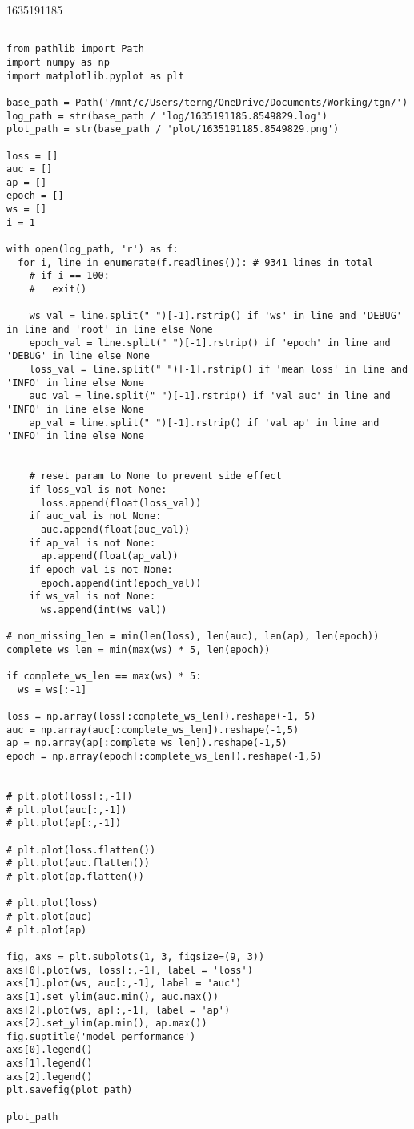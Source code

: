 \documentclass[11pt]{article}
\begin{document}
1635191185
\begin{verbatim}

from pathlib import Path
import numpy as np
import matplotlib.pyplot as plt

base_path = Path('/mnt/c/Users/terng/OneDrive/Documents/Working/tgn/')
log_path = str(base_path / 'log/1635191185.8549829.log')
plot_path = str(base_path / 'plot/1635191185.8549829.png')

loss = []
auc = []
ap = []
epoch = []
ws = []
i = 1

with open(log_path, 'r') as f:
  for i, line in enumerate(f.readlines()): # 9341 lines in total
    # if i == 100:
    #   exit()

    ws_val = line.split(" ")[-1].rstrip() if 'ws' in line and 'DEBUG' in line and 'root' in line else None
    epoch_val = line.split(" ")[-1].rstrip() if 'epoch' in line and 'DEBUG' in line else None
    loss_val = line.split(" ")[-1].rstrip() if 'mean loss' in line and 'INFO' in line else None
    auc_val = line.split(" ")[-1].rstrip() if 'val auc' in line and 'INFO' in line else None
    ap_val = line.split(" ")[-1].rstrip() if 'val ap' in line and 'INFO' in line else None


    # reset param to None to prevent side effect
    if loss_val is not None:
      loss.append(float(loss_val))
    if auc_val is not None:
      auc.append(float(auc_val))
    if ap_val is not None:
      ap.append(float(ap_val))
    if epoch_val is not None:
      epoch.append(int(epoch_val))
    if ws_val is not None:
      ws.append(int(ws_val))

# non_missing_len = min(len(loss), len(auc), len(ap), len(epoch))
complete_ws_len = min(max(ws) * 5, len(epoch))

if complete_ws_len == max(ws) * 5:
  ws = ws[:-1]

loss = np.array(loss[:complete_ws_len]).reshape(-1, 5)
auc = np.array(auc[:complete_ws_len]).reshape(-1,5)
ap = np.array(ap[:complete_ws_len]).reshape(-1,5)
epoch = np.array(epoch[:complete_ws_len]).reshape(-1,5)


# plt.plot(loss[:,-1])
# plt.plot(auc[:,-1])
# plt.plot(ap[:,-1])

# plt.plot(loss.flatten())
# plt.plot(auc.flatten())
# plt.plot(ap.flatten())

# plt.plot(loss)
# plt.plot(auc)
# plt.plot(ap)

fig, axs = plt.subplots(1, 3, figsize=(9, 3))
axs[0].plot(ws, loss[:,-1], label = 'loss')
axs[1].plot(ws, auc[:,-1], label = 'auc')
axs[1].set_ylim(auc.min(), auc.max())
axs[2].plot(ws, ap[:,-1], label = 'ap')
axs[2].set_ylim(ap.min(), ap.max())
fig.suptitle('model performance')
axs[0].legend()
axs[1].legend()
axs[2].legend()
plt.savefig(plot_path)

plot_path
\end{verbatim}
\end{document}
